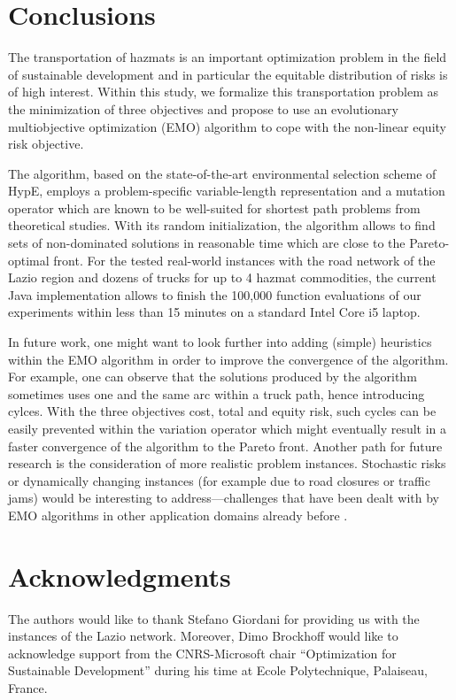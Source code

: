 \documentclass[preprint,12pt]{elsarticle}
\begin{document}
\section{Conclusions} \label{S_FW}
The transportation of hazmats is an important optimization problem in the field of sustainable development and in particular the equitable distribution of risks is of high interest. Within this study, we formalize this transportation problem as the minimization of three objectives and propose to use an evolutionary multiobjective optimization (EMO) algorithm to cope with the non-linear equity risk objective.

The algorithm, based on the state-of-the-art environmental selection scheme of HypE, employs a problem-specific variable-length representation and a mutation operator which are known to be well-suited for shortest path problems from theoretical studies. With its random initialization, the algorithm allows to find sets of non-dominated solutions in reasonable time which are close to the Pareto-optimal front. For the tested real-world instances with the road network of the Lazio region and dozens of trucks for up to 4 hazmat commodities, the current Java implementation allows to finish the 100,000 function evaluations of our experiments within less than 15 minutes on a standard Intel Core i5 laptop. 

In future work, one might want to look further into adding (simple) heuristics within the EMO algorithm in order to improve the convergence of the algorithm. For example, one can observe that the solutions produced by the algorithm sometimes uses one and the same arc within a truck path, hence introducing cylces. With the three objectives cost, total and equity risk, such cycles can be easily prevented within the variation operator which might eventually result in a faster convergence of the algorithm to the Pareto front. Another path for future research is the consideration of more realistic problem instances. Stochastic risks or dynamically changing instances (for example due to road closures or traffic jams) would be interesting to address---challenges that have been dealt with by EMO algorithms in other application domains already before \cite{deb2001,cvl2007a}.



\section{Acknowledgments}
The authors would like to thank Stefano Giordani for providing us with the instances of the Lazio network. Moreover, Dimo Brockhoff would like to acknowledge support from the CNRS-Microsoft chair "`Optimization for Sustainable Development"' during his time at Ecole Polytechnique, Palaiseau, France.


% 
 
 \footnotesize
 
\end{document}
